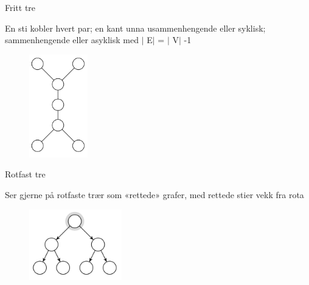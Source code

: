 \documentclass[12pt]{report}
\begin{document}
\vspace{\baselineskip}
\begin{multicols}{2}
{\fontsize{13pt}{15.6pt}\selectfont Fritt tre\par}\par

	\item {\fontsize{11pt}{13.2pt}\selectfont En sti kobler hvert par; en kant unna usammenhengende eller syklisk; sammenhengende eller asyklisk med $ \vert $ E$ \vert $  = $ \vert $ V$ \vert $ -1\par}\par




\begin{figure}[H]
	\begin{Center}
		\includegraphics[width=1.0in,height=1.76in]{./media/image70.png}
	\end{Center}
\end{figure}



\par

{\fontsize{13pt}{15.6pt}\selectfont Rotfast tre\par}\par

	\item {\fontsize{11pt}{13.2pt}\selectfont Ser gjerne på rotfaste trær som «rettede» grafer, med rettede stier vekk fra rota\par}\par




\begin{figure}[H]
	\begin{Center}
		\includegraphics[width=1.58in,height=1.21in]{./media/image71.png}
	\end{Center}
\end{figure}




\end{multicols}
\par
\end{document}
